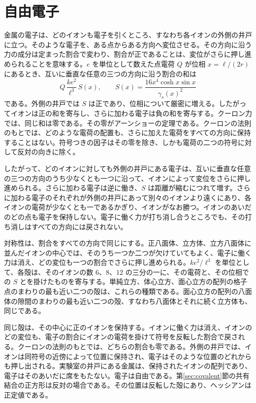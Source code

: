 \documentclass[a4paper]{article}
\begin{document}
\section{自由電子}
\label{sec:free}

金属の電子は、どのイオンも電子を引くところ、すなわち各イオンの外側の井戸に立つ。そのような電子を、ある点からある方向へ変位させる。その方向に沿う力の成分は定まった割合で変わり、割合が正であることは、変位がさらに押し進められることを意味する。\(e\) を単位として数えた点電荷 \(Q\) が位相 \(x=\ell/(2r)\) にあるとき、互いに垂直な任意の三つの方向に沿う割合の和は
\begin{equation}
\label{eq:outflow}
Q\,\frac{k e^{2}}{\ell^{3}}\,S(x),
\qquad
S(x)=\frac{16x^{4}\cosh x\sin x}{\gamma_s(x)^{2}}
\end{equation}
である。外側の井戸では \(S\) は正であり、位相について厳密に増える。したがってイオンは正の和を寄与し、さらに加わる電子は負の和を寄与する。クーロン力では、同じ和は零である。その零がアーンショーの定理である。クーロンの法則のもとでは、どのような電荷の配置も、さらに加えた電荷をすべての方向に保持することはない。符号つきの因子はその零を除き、しかも電荷の二つの符号に対して反対の向きに除く。

したがって、どのイオンに対しても外側の井戸にある電子は、互いに垂直な任意の三つの方向のうち少なくとも一つに沿って、イオンによって変位をさらに押し進められる。さらに加わる電子は逆に働き、\(S\) は距離が縮むにつれて増す。さらに加わる電子のそれぞれが外側の井戸にあって別々のイオンより遠くにあり、各イオンの電荷が少なくとも一であるかぎり、イオンがなお勝つ。イオンのあいだのどの点も電子を保持しない。電子に働く力が打ち消し合うところでも、その打ち消しはすべての方向には戻されない。

対称性は、割合をすべての方向で同じにする。正八面体、立方体、立方八面体に並んだイオンの中心では、そのうち一つか二つが欠けていてもよく、電子に働く力は消え、どの変位も一つの割合でさらに押し進められる。\(k e^{2}/\ell^{3}\) を単位として、各殻は、そのイオンの数 \(6\)、\(8\)、\(12\) の三分の一に、その電荷と、その位相での \(S\) とを掛けたものを寄与する。単純立方、体心立方、面心立方の配列の格子点のまわりの最も近い二つの殻は、これらの種類である。面心立方の配列の八面体の隙間のまわりの最も近い二つの殻、すなわち八面体とそれに続く立方体も、同じである。

同じ殻は、その中心に正のイオンを保持する。イオンに働く力は消え、イオンのどの変位も、電子の割合にイオンの電荷を掛けて符号を反転した割合で戻される。クーロンの法則のもとでは、どちらの割合も零である。外側の井戸では、イオンは同符号の近傍によって位置に保持され、電子はそのような位置のどれからも押し出される。実験室の井戸にある金属は、保持されたイオンの配列であり、電子はそのあいだに席をもたない。電子は自由である。第\ref{sec:covalent}節の共有結合の正方形は反対の場合である。その位置は反転した殻にあり、ヘッシアンは正定値である。
\end{document}
